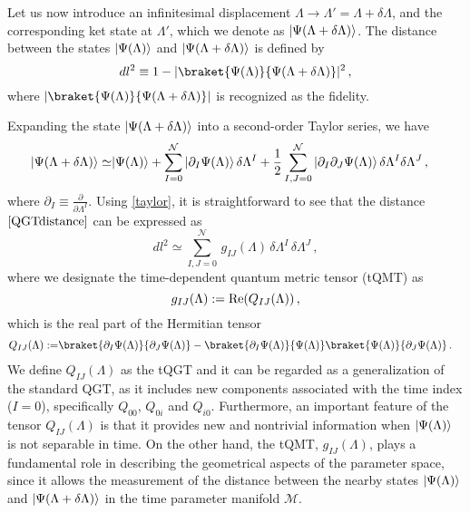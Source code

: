 \documentclass[12pt]{iopart}
\DeclarePairedDelimiter\ket{\lvert}{\rangle}
\begin{document}
Let us now introduce an infinitesimal displacement $\Lambda \rightarrow \Lambda'=\Lambda+\delta \Lambda$, and the corresponding ket state at $\Lambda'$, which we denote as $\ket{\Psi(\Lambda+\delta \Lambda)}$. The distance between the states $\ket{\Psi(\Lambda)}$ and $\ket{\Psi(\Lambda+\delta \Lambda)}$ is defined by 
\begin{equation}\label{QGTdistance}
dl^2\equiv 1 - | \braket{\Psi(\Lambda)}{\Psi(\Lambda+\delta \Lambda)} |^2 \,,
\end{equation}
where $| \braket{\Psi(\Lambda)}{\Psi(\Lambda+\delta \Lambda)} |$ is recognized as the fidelity. 

Expanding the state $\ket{\Psi(\Lambda+\delta \Lambda)}$ into a second-order Taylor series, we have
\begin{align}\label{taylor}
    \ket{\Psi(\Lambda+\delta \Lambda)} \simeq   &\ket{\Psi(\Lambda)}+ \sum_{I=0}^{\mathcal{N}} \, \ket{\partial_I\Psi(\Lambda)} \, \delta \Lambda^I +\frac12 \sum_{I,J=0}^{\mathcal{N}} \,\ket{\partial_I\partial_J\Psi(\Lambda)}\, \delta \Lambda^I \delta \Lambda^J  \,,
\end{align}
where $\partial_I\equiv \frac{\partial}{\partial \Lambda^I}$. Using \eqref{taylor}, it is straightforward to see that the distance $\eqref{QGTdistance}$ can be expressed as
\begin{equation}
 dl^2\simeq \sum_{I,J=0}^{\mathcal{N}} \, g_{IJ}(\Lambda) \, \delta \Lambda^I \, \delta \Lambda^J\,, 
\end{equation}
where we designate the time-dependent quantum metric tensor (tQMT) as
\begin{equation}\label{metric-tensor-time}
    g_{IJ}(\Lambda) :={\rm Re}(Q_{IJ}(\Lambda))\,,
\end{equation}
which is the real part of the Hermitian tensor
\begin{align}\label{QGT-time}
Q_{IJ}(\Lambda) :=& \braket{\partial_I\Psi(\Lambda)}{\partial_J\Psi(\Lambda)} -\braket{\partial_I\Psi(\Lambda)}{\Psi(\Lambda)}\braket{\Psi(\Lambda)}{\partial_J\Psi(\Lambda)}\,.
\end{align}
We define $Q_{IJ}(\Lambda)$ as the tQGT and it can be regarded as a generalization of the standard QGT, as it includes new components associated with the time index ($I=0$), specifically $Q_{00}$, $Q_{0i}$ and $Q_{i0}$. Furthermore, an important feature of the tensor $Q_{IJ}(\Lambda)$ is that it provides new and nontrivial information when $\ket{\Psi(\Lambda)}$ is not separable in time. On the other hand, the tQMT, $g_{IJ}(\Lambda)$, plays a fundamental role in describing the geometrical aspects of the parameter space, since it allows the measurement of the distance between the nearby states $\ket{\Psi(\Lambda)}$ and $\ket{\Psi(\Lambda+\delta \Lambda)}$ in the time parameter manifold $\mathcal{M}$. 
\end{document}
